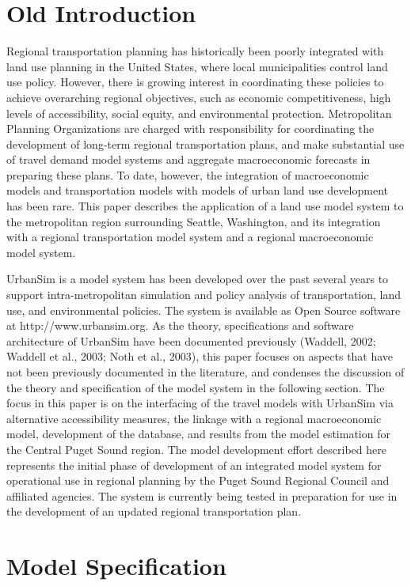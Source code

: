 \section{Old Introduction}
Regional transportation planning has historically been poorly
integrated with land use planning in the United States, where
local municipalities control land use policy.  However, there is
growing interest in coordinating these policies to achieve
overarching regional objectives, such as economic competitiveness,
high levels of accessibility, social equity, and environmental
protection.  Metropolitan Planning Organizations are charged with
responsibility for coordinating the development of long-term
regional transportation plans, and make substantial use of travel
demand model systems and aggregate macroeconomic forecasts in
preparing these plans.   To date, however, the integration of
macroeconomic models and transportation models with models of
urban land use development has been rare.  This paper describes
the application of a land use model system to the metropolitan
region surrounding Seattle, Washington, and its integration with a
regional transportation model system and a regional macroeconomic
model system.

UrbanSim is a model system has been developed over the past
several years to support intra-metropolitan simulation and policy
analysis of transportation, land use, and environmental policies.
The system is available as Open Source software at
http://www.urbansim.org. As the theory, specifications and
software architecture of UrbanSim have been documented previously
(Waddell, 2002; Waddell et al., 2003; Noth et al., 2003), this
paper focuses on aspects that have not been previously documented
in the literature, and condenses the discussion of the theory and
specification of the model system in the following section. The
focus in this paper is on the interfacing of the travel models
with UrbanSim via alternative accessibility measures, the linkage
with a regional macroeconomic model, development of the database,
and results from the model estimation for the Central Puget Sound
region.  The model development effort described here represents
the initial phase of development of an integrated model system for
operational use in regional planning by the Puget Sound Regional
Council and affiliated agencies.  The system is currently being
tested in preparation for use in the development of an updated
regional transportation plan.

\section{Model Specification}

